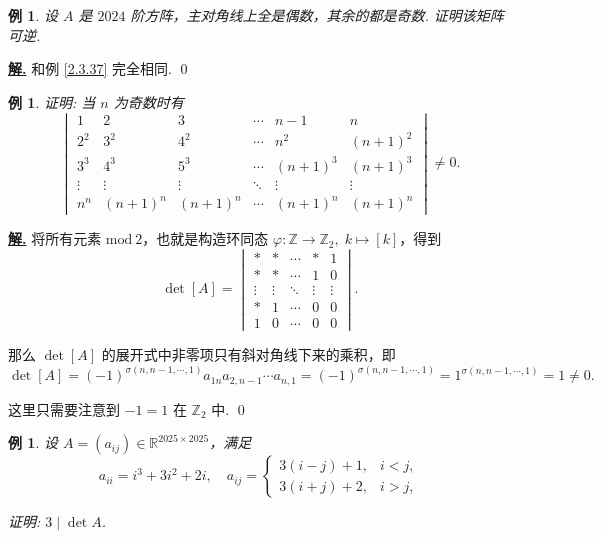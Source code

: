 \documentclass[10pt,openany]{article}
\theoremstyle{thmstyle} %
\theoremstyle{defstyle} %
\theoremstyle{prostyle} %
\theoremstyle{exastyle}
\newtheorem{example}[theorem]{例}
\theoremstyle{remstyle}
\newenvironment{solution}{\par\underline{\textbf{解.}} \;\fangsong}{\qed\par}
\begin{document}
\begin{example}
	设 \( A  \) 是 \( 2024 \) 阶方阵，主对角线上全是偶数，其余的都是奇数. 证明该矩阵可逆.
\end{example}

\begin{solution}
	和例 \ref{2.3.37} 完全相同.
\end{solution}

\begin{example}
	证明: 当 \( n \) 为奇数时有 \[
	\begin{vmatrix}
		1 & 2 & 3 & \cdots & n-1 & n \\
		2^2 & 3^2 & 4^2 & \cdots & n^2 & (n+1)^2 \\
		3^3 & 4^3 & 5^3 & \cdots & (n+1)^3 & (n+1)^3 \\
		\vdots & \vdots & \vdots & \ddots & \vdots & \vdots \\
		n^n & (n+1)^n & (n+1)^n & \cdots & (n+1)^n & (n+1)^n
	\end{vmatrix} \neq 0.
	\]
\end{example}

\begin{solution}
	将所有元素 \( \text{mod} \ 2 \)，也就是构造环同态 \( \varphi: \mathbb{Z} \to \mathbb{Z}_2, \; k \mapsto [k] \)，得到
	\[ \det [A]=\begin{vmatrix}
		* & * & \cdots & * & 1 \\
		* & * & \cdots & 1 & 0 \\
		\vdots & \vdots & \ddots & \vdots & \vdots \\
		* & 1 & \cdots & 0 & 0 \\
		1 & 0 & \cdots & 0 & 0
	\end{vmatrix}.  \]
	
	那么 \( \det [A] \) 的展开式中非零项只有斜对角线下来的乘积，即
	\[ \det [A]= (-1)^{\sigma(n,n-1,\cdots,1)} a_{1n}a_{2,n-1}\cdots a_{n,1}=(-1)^{\sigma(n,n-1,\cdots,1)}=1^{\sigma(n,n-1,\cdots,1)}=1 \neq 0. \]
	
	这里只需要注意到 \( -1=1 \) 在 \( \mathbb{Z}_2 \) 中.
\end{solution}

\begin{example}
	设 \( A = (a_{ij}) \in \mathbb{R}^{2025 \times 2025} \)，满足
	\[
	a_{ii} = i^3 + 3i^2 + 2i, \quad
	a_{ij} = \left\{ \begin{array}{lr}
	3(i - j) + 1, & i < j, \\
	3(i + j) + 2, & i > j,
	\end{array}\right.
	\]
	
	证明: \( 3 \mid \det A \).
\end{example}
\end{document}
